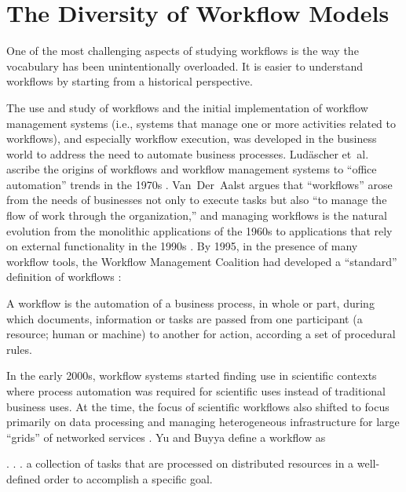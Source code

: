 \section{The Diversity of Workflow Models}\label{workflows}

One of the most challenging aspects of studying workflows is the way the
vocabulary has been unintentionally overloaded.  It is easier to
understand workflows by starting from a historical perspective.

The use and study of workflows and the initial implementation of workflow
management systems (i.e., systems that manage one or more activities related to
workflows), and especially workflow execution, was developed in the business
world to address the need to automate business processes. Lud\"{a}scher et~al. 
ascribe the origins of workflows and workflow management systems to ``office
automation'' trends in the 1970s \cite{ludascher_scientific_2006}.
Van~Der~Aalst argues that ``workflows'' arose from the needs of businesses not
only to execute tasks but also ``to manage the flow of work through
the organization,'' and managing workflows is the natural evolution from the
monolithic applications of the 1960s to applications that rely on external
functionality in the 1990s \cite{van_der_aalst_application_1998}. By 1995, in
the presence of many workflow tools, the Workflow Management Coalition had
developed a ``standard'' definition of workflows
\cite{hollingsworth_workflow_1993}:

\begin{displayquote} A workflow is the automation of a business process, in
whole or part, during which documents, information or tasks are passed from one
participant (a resource; human or machine) to another for action, according a
set of procedural rules.  \end{displayquote}

In the early 2000s, workflow systems started finding use in scientific contexts
where process automation was required for scientific uses instead of traditional
business uses. At the time, the focus of scientific workflows also shifted to
focus primarily on data processing and managing heterogeneous infrastructure for
large ``grids'' of networked services \cite{yu_taxonomy_2005}. Yu and Buyya
define a workflow as 

\begin{displayquote}. . .  a collection of tasks that are processed on
distributed resources in a well-defined order to accomplish a specific
goal.\end{displayquote}

